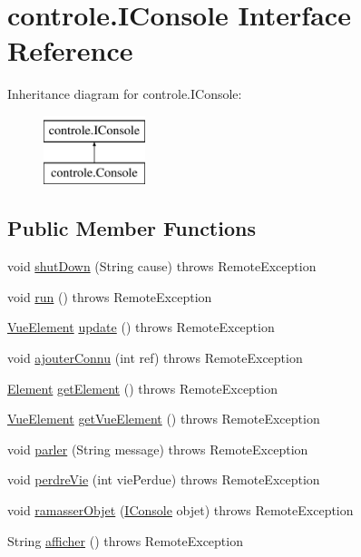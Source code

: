 \hypertarget{interfacecontrole_1_1_i_console}{\section{controle.\-I\-Console Interface Reference}
\label{interfacecontrole_1_1_i_console}
}
Inheritance diagram for controle.\-I\-Console\-:\begin{figure}[H]
\begin{center}
\leavevmode
\includegraphics[height=2.000000cm]{interfacecontrole_1_1_i_console}
\end{center}
\end{figure}
\subsection*{Public Member Functions}
\begin{DoxyCompactItemize}
\item 
void \hyperlink{interfacecontrole_1_1_i_console_a77e327568514ec7eed8161c6b73e4d9a}{shut\-Down} (String cause)  throws Remote\-Exception
\item 
void \hyperlink{interfacecontrole_1_1_i_console_afb2a3e548fe438ac7af6bc429fc84132}{run} ()  throws Remote\-Exception
\item 
\hyperlink{classinterface_graphique_1_1_vue_element}{Vue\-Element} \hyperlink{interfacecontrole_1_1_i_console_ab6728a4bf807f04e5d13bfd452a69bc2}{update} ()  throws Remote\-Exception
\item 
void \hyperlink{interfacecontrole_1_1_i_console_ac0aefd004a73641f8ba6ef57266c0508}{ajouter\-Connu} (int ref)  throws Remote\-Exception
\item 
\hyperlink{classindividu_1_1_element}{Element} \hyperlink{interfacecontrole_1_1_i_console_a0cde95415052505230b482a2b5fed5fd}{get\-Element} ()  throws Remote\-Exception
\item 
\hyperlink{classinterface_graphique_1_1_vue_element}{Vue\-Element} \hyperlink{interfacecontrole_1_1_i_console_a5fc11711131f9a99768d36bffc695535}{get\-Vue\-Element} ()  throws Remote\-Exception
\item 
void \hyperlink{interfacecontrole_1_1_i_console_ab200b6a49e88391691be5df49cfa36f2}{parler} (String message)  throws Remote\-Exception
\item 
void \hyperlink{interfacecontrole_1_1_i_console_ace6ee762b3f067e26f478066a9c1283f}{perdre\-Vie} (int vie\-Perdue)  throws Remote\-Exception
\item 
void \hyperlink{interfacecontrole_1_1_i_console_a90d8826ee94075bc55a52779a0257b85}{ramasser\-Objet} (\hyperlink{interfacecontrole_1_1_i_console}{I\-Console} objet)  throws Remote\-Exception
\item 
String \hyperlink{interfacecontrole_1_1_i_console_a6166aa60251707f3c095e8e197a88dac}{afficher} ()  throws Remote\-Exception
\end{DoxyCompactItemize}


